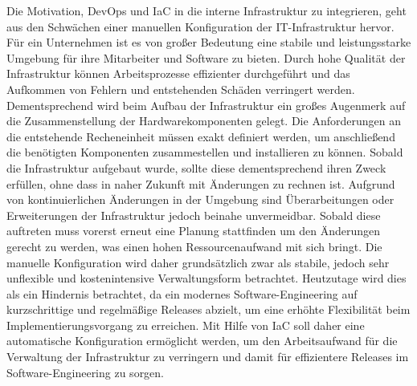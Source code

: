 \documentclass[biblatex]{lni}
\begin{document}
Die Motivation, DevOps und IaC in die interne Infrastruktur zu integrieren, geht aus den Schwächen einer manuellen Konfiguration der IT-Infrastruktur hervor. Für ein Unternehmen ist es von großer Bedeutung eine stabile und leistungsstarke Umgebung für ihre Mitarbeiter und Software zu bieten. Durch hohe Qualität der Infrastruktur können Arbeitsprozesse effizienter durchgeführt und das Aufkommen von Fehlern und entstehenden Schäden verringert werden. Dementsprechend wird beim Aufbau der Infrastruktur ein großes Augenmerk auf die Zusammenstellung der Hardwarekomponenten gelegt. Die Anforderungen an die entstehende Recheneinheit müssen exakt definiert werden, um anschließend die benötigten Komponenten zusammestellen und installieren zu können. Sobald die Infrastruktur aufgebaut wurde, sollte diese dementsprechend ihren Zweck erfüllen, ohne dass in naher Zukunft mit Änderungen zu rechnen ist. Aufgrund von kontinuierlichen Änderungen in der Umgebung sind Überarbeitungen oder Erweiterungen der Infrastruktur jedoch beinahe unvermeidbar. Sobald diese auftreten muss vorerst erneut eine Planung stattfinden um den Änderungen gerecht zu werden, was einen hohen Ressourcenaufwand mit sich bringt. Die manuelle Konfiguration wird daher grundsätzlich zwar als stabile, jedoch sehr unflexible und kostenintensive Verwaltungsform betrachtet. Heutzutage wird dies als ein Hindernis betrachtet, da ein modernes Software-Engineering auf kurzschrittige und regelmäßige Releases abzielt, um eine erhöhte Flexibilität beim Implementierungsvorgang zu erreichen. Mit Hilfe von IaC soll daher eine automatische Konfiguration ermöglicht werden, um den Arbeitsaufwand für die Verwaltung der Infrastruktur zu verringern und damit für effizientere Releases im Software-Engineering zu sorgen.
\end{document}
